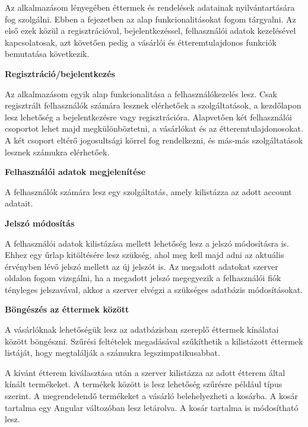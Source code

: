 
Az alkalmazásom lényegében éttermek és rendelések adatainak nyilvántartására fog szolgálni. Ebben a fejezetben az alap funkcionalitásokat fogom tárgyalni. Az első ezek közül a regisztrációval, bejelentkezéssel, felhasználói adatok kezelésével kapcsolatosak, azt követően pedig a vásárlói és étteremtulajdonos funkciók bemutatása következik.

\bigskip

\noindent \textbf{Regisztráció/bejelentkezés}

\medskip

Az alkalmazásom egyik alap funkcionalitása a felhasználókezelés lesz. Csak regisztrált felhasználók számára lesznek elérhetőek a szolgáltatások, a kezdőlapon lesz lehetőség a bejelentkezésre vagy regisztrációra. Alapvetően két felhasználói csoportot lehet majd megkülönböztetni, a vásárlókat és az étteremtulajdonosokat. A két csoport eltérő jogosultsági körrel fog rendelkezni, és más-más szolgáltatások lesznek számukra elérhetőek.

\bigskip

\noindent \textbf{Felhasználói adatok megjelenítése}

\bigskip

A felhasználók számára lesz egy szolgáltatás, amely kilistázza az adott account adatait.

\bigskip

\noindent \textbf{Jelszó módosítás}

\bigskip

A felhasználói adatok kilistázása mellett lehetőség lesz a jelszó módosításra is. Ehhez egy űrlap kitöltésére lesz szükség, ahol meg kell majd adni az aktuális érvényben lévő jelszó mellett az új jelszót is. Az megadott adatokat szerver oldalon fogom vizsgálni, ha a megadott jelszó megegyezik a felhasználói fiók tényleges jelszavával, akkor a szerver elvégzi a szükséges adatbázis módosításokat.


\bigskip

\noindent \textbf{Böngészés az éttermek között}

\bigskip

A vásárlóknak lehetőségük lesz az adatbázisban szereplő éttermek kínálatai között böngészni. Szűrési feltételek megadásával szűkíthetik a kilistázott éttermek listáját, hogy megtalálják a számukra legszimpatikusabbat.

A kívánt étterem kiválasztása után a szerver kilistázza az adott étterem által kínált termékeket. A termékek között is lesz lehetőség szűrésre például típus szerint. A megrendelendő termékeket a vásárló belehelyezheti a kosárba. A kosár tartalma egy Angular változóban lesz letárolva. A kosár tartalma is módosítható lesz.

